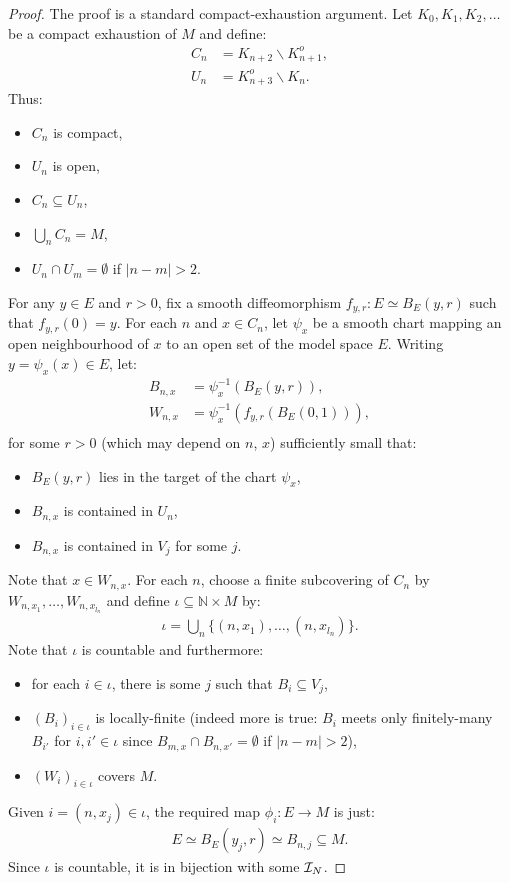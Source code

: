 \begin{proof}
  \leanok
  The proof is a standard compact-exhaustion argument.
  Let $K_0, K_1, K_2, \ldots $ be a compact exhaustion of $M$ and define:
  \begin{align*}
    C_n &= K_{n+2} \smallsetminus K_{n+1}^o,\\
    U_n &= K_{n+3}^o \smallsetminus K_n.
  \end{align*}
  Thus:
  \begin{itemize}
    \item $C_n$ is compact,
    \item $U_n$ is open,
    \item $C_n \subseteq U_n$,
    \item $\bigcup_n C_n = M$,
    \item $U_n \cap U_m = \emptyset$ if $|n - m| > 2$.
  \end{itemize}
  For any $y \in E$ and $r > 0$, fix a smooth diffeomorphism $f_{y,r} : E \simeq B_E(y, r)$ such
  that $f_{y,r}(0) = y$.
  For each $n$ and $x \in C_n$, let $\psi_x$  be a smooth chart mapping an open
  neighbourhood of $x$ to an open set of the model space $E$.
  Writing $y = \psi_x (x) \in E$, let:
  \begin{align*}
    B_{n, x} &= \psi_x^{-1} (B_E(y, r)),\\
    W_{n, x} &= \psi_x^{-1} (f_{y,r} (B_E (0, 1))),\\
  \end{align*}
  for some $r > 0$ (which may depend on $n$, $x$) sufficiently small that:
  \begin{itemize}
    \item $B_E(y, r)$ lies in the target of the chart $\psi_x$,
    \item $B_{n,x}$ is contained in $U_n$,
    \item $B_{n,x}$ is contained in $V_j$ for some $j$.
  \end{itemize}
  Note that $x \in W_{n,x}$. For each $n$, choose a finite subcovering of $C_n$ by
  $W_{n, x_1}, \ldots, W_{n, x_{l_n}}$ and define $\iota \subseteq ℕ \times M$ by:
  \begin{align*}
    \iota = \bigcup_n \{ (n, x_1), \ldots, (n, x_{l_n}) \} .
  \end{align*}
  Note that $\iota$ is countable and furthermore:
  \begin{itemize}
    \item for each $i \in \iota$, there is some $j$ such that $B_i \subseteq V_j$,
    \item $(B_i)_{i \in \iota}$ is locally-finite
    (indeed more is true: $B_i$ meets only finitely-many $B_{i'}$ for $i, i' \in \iota$
    since $B_{m, x} \cap B_{n, x'} = \emptyset$ if $|n - m| > 2$),
    \item $(W_i)_{i \in \iota}$ covers $M$.
  \end{itemize}
  Given $i = (n, x_j) \in \iota$, the required map $\phi_i : E \to M$ is just:
  \begin{align*}
    E \simeq B_E(y_j, r) \simeq B_{n,j} \subseteq M.
  \end{align*}
  Since $ι$ is countable, it is in bijection with some $\mathcal{I}_{N}$.
\end{proof}

